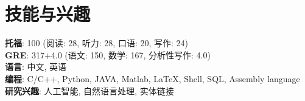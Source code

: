 \section{技能与兴趣}
\textbf{托福}: 100 (阅读: 28, 听力: 28, 口语: 20, 写作: 24)\\
\textbf{GRE}: 317+4.0 (语文: 150, 数学: 167, 分析性写作: 4.0)\\
\textbf{语言}: 中文, 英语\\
\textbf{编程}: C/C++, Python, JAVA, Matlab, LaTeX, Shell, SQL, Assembly language\\
\textbf{研究兴趣}: 人工智能, 自然语言处理, 实体链接

